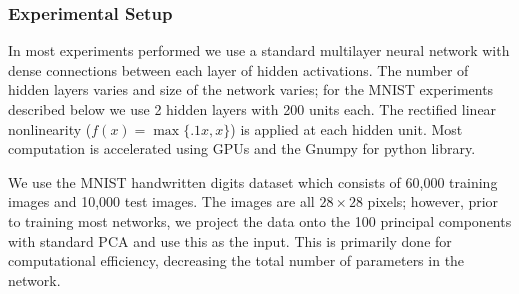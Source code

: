 \subsubsection*{Experimental Setup}

In most experiments performed we use a standard multilayer neural network with
dense connections between each layer of hidden activations. The number of
hidden layers varies and size of the network varies; for the MNIST experiments
described below we use 2 hidden layers with 200 units each. The rectified
linear nonlinearity ($f(x) = \max\{.1x,x\}$) is applied at each hidden unit. Most
computation is accelerated using GPUs and the Gnumpy for python library. 

We use the MNIST handwritten digits dataset which consists of 60,000 training
images and 10,000 test images. The images are all $28\times28$ pixels; however, prior
to training most networks, we project the data onto the 100 principal
components with standard PCA and use this as the input. This is primarily done for
computational efficiency, decreasing the total number of parameters in the
network.
